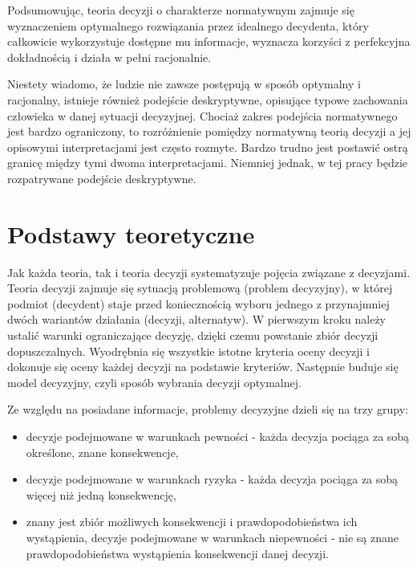 Podsumowując, teoria decyzji o charakterze normatywnym zajmuje się wyznaczeniem 
optymalnego rozwiązania przez idealnego decydenta, który całkowicie wykorzystuje
dostępne mu informacje, wyznacza korzyści z perfekcyjna dokładnością i działa w 
pełni racjonalnie.

Niestety wiadomo, że ludzie nie zawsze postępują w sposób optymalny i
racjonalny,  istnieje również podejście deskryptywne, opisujące typowe 
zachowania człowieka w danej sytuacji decyzyjnej. Chociaż zakres podejścia 
normatywnego jest bardzo ograniczony, to rozróżnienie pomiędzy normatywną 
teorią decyzji a jej opisowymi interpretacjami jest często rozmyte. Bardzo 
trudno jest postawić ostrą granicę między tymi dwoma interpretacjami. Niemniej 
jednak, w tej pracy będzie rozpatrywane podejście deskryptywne.

\section{Podstawy teoretyczne}
Jak każda teoria, tak i teoria decyzji systematyzuje pojęcia związane z 
decyzjami. Teoria decyzji zajmuje się sytuacją problemową (problem decyzyjny), 
w której podmiot (decydent) staje przed koniecznością wyboru jednego z 
przynajmniej dwóch wariantów działania (decyzji, alternatyw). W pierwszym kroku 
należy ustalić warunki ograniczające decyzję, dzięki czemu powstanie zbiór 
decyzji dopuszczalnych. Wyodrębnia się wszystkie istotne kryteria oceny decyzji 
i dokonuje się oceny każdej decyzji na podstawie kryteriów. Następnie buduje 
się model decyzyjny, czyli sposób wybrania decyzji optymalnej.

Ze względu na posiadane informacje, problemy decyzyjne dzieli się na trzy grupy:
\begin{itemize}
  \item decyzje podejmowane w warunkach pewności - każda decyzja pociąga za 
  sobą określone, znane konsekwencje,
  
  \item decyzje podejmowane w warunkach ryzyka - każda decyzja pociąga za sobą 
  więcej niż jedną konsekwencję,
  
  \item znany jest zbiór możliwych konsekwencji i prawdopodobieństwa ich 
  wystąpienia, decyzje podejmowane w warunkach niepewności - nie są znane 
  prawdopodobieństwa wystąpienia konsekwencji danej decyzji.

\end{itemize}

